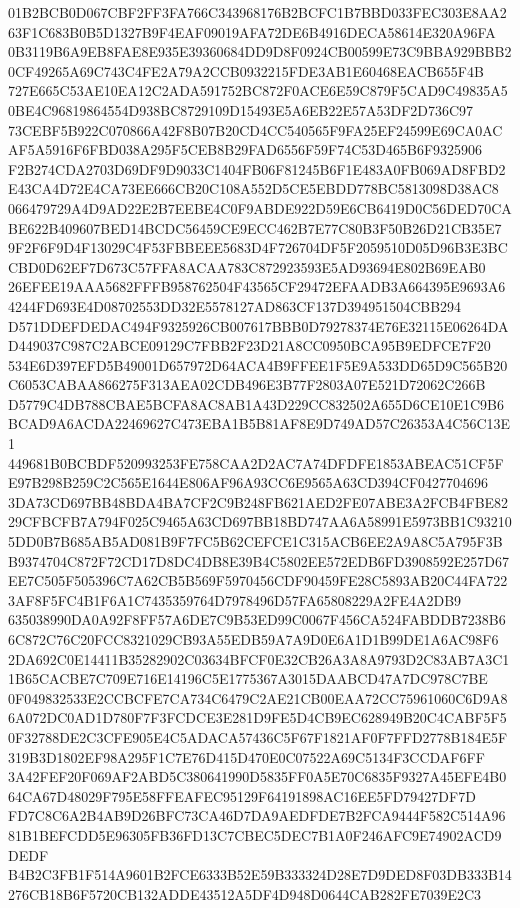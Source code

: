 \documentclass[UTF8,fontset=fandol,zihao=-4,a4paper]{ctexart}
\begin{document}
{{01B2BCB0D067CBF2FF3FA766C343968176B2BCFC1B7BBD033FEC303E8AA263F1C683B0B5D1327B9F4EAF09019AFA72DE6B4916DECA58614E320A96FA
0B3119B6A9EB8FAE8E935E39360684DD9D8F0924CB00599E73C9BBA929BBB20CF49265A69C743C4FE2A79A2CCB0932215FDE3AB1E60468EACB655F4B
727E665C53AE10EA12C2ADA591752BC872F0ACE6E59C879F5CAD9C49835A50BE4C96819864554D938BC8729109D15493E5A6EB22E57A53DF2D736C97
73CEBF5B922C070866A42F8B07B20CD4CC540565F9FA25EF24599E69CA0ACAF5A5916F6FBD038A295F5CEB8B29FAD6556F59F74C53D465B6F9325906
F2B274CDA2703D69DF9D9033C1404FB06F81245B6F1E483A0FB069AD8FBD2E43CA4D72E4CA73EE666CB20C108A552D5CE5EBDD778BC5813098D38AC8
066479729A4D9AD22E2B7EEBE4C0F9ABDE922D59E6CB6419D0C56DED70CABE622B409607BED14BCDC56459CE9ECC462B7E77C80B3F50B26D21CB35E7
9F2F6F9D4F13029C4F53FBBEEE5683D4F726704DF5F2059510D05D96B3E3BCCBD0D62EF7D673C57FFA8ACAA783C872923593E5AD93694E802B69EAB0
26EFEE19AAA5682FFFB958762504F43565CF29472EFAADB3A664395E9693A64244FD693E4D08702553DD32E5578127AD863CF137D394951504CBB294
D571DDEFDEDAC494F9325926CB007617BBB0D79278374E76E32115E06264DAD449037C987C2ABCE09129C7FBB2F23D21A8CC0950BCA95B9EDFCE7F20
534E6D397EFD5B49001D657972D64ACA4B9FFEE1F5E9A533DD65D9C565B20C6053CABAA866275F313AEA02CDB496E3B77F2803A07E521D72062C266B
D5779C4DB788CBAE5BCFA8AC8AB1A43D229CC832502A655D6CE10E1C9B6BCAD9A6ACDA22469627C473EBA1B5B81AF8E9D749AD57C26353A4C56C13E1
449681B0BCBDF520993253FE758CAA2D2AC7A74DFDFE1853ABEAC51CF5FE97B298B259C2C565E1644E806AF96A93CC6E9565A63CD394CF0427704696
3DA73CD697BB48BDA4BA7CF2C9B248FB621AED2FE07ABE3A2FCB4FBE8229CFBCFB7A794F025C9465A63CD697BB18BD747AA6A58991E5973BB1C93210
5DD0B7B685AB5AD081B9F7FC5B62CEFCE1C315ACB6EE2A9A8C5A795F3BB9374704C872F72CD17D8DC4DB8E39B4C5802EE572EDB6FD3908592E257D67
EE7C505F505396C7A62CB5B569F5970456CDF90459FE28C5893AB20C44FA7223AF8F5FC4B1F6A1C7435359764D7978496D57FA65808229A2FE4A2DB9
635038990DA0A92F8FF57A6DE7C9B53ED99C0067F456CA524FABDDB7238B66C872C76C20FCC8321029CB93A55EDB59A7A9D0E6A1D1B99DE1A6AC98F6
2DA692C0E14411B35282902C03634BFCF0E32CB26A3A8A9793D2C83AB7A3C11B65CACBE7C709E716E14196C5E1775367A3015DAABCD47A7DC978C7BE
0F049832533E2CCBCFE7CA734C6479C2AE21CB00EAA72CC75961060C6D9A86A072DC0AD1D780F7F3FCDCE3E281D9FE5D4CB9EC628949B20C4CABF5F5
0F32788DE2C3CFE905E4C5ADACA57436C5F67F1821AF0F7FFD2778B184E5F319B3D1802EF98A295F1C7E76D415D470E0C07522A69C5134F3CCDAF6FF
3A42FEF20F069AF2ABD5C380641990D5835FF0A5E70C6835F9327A45EFE4B064CA67D48029F795E58FFEAFEC95129F64191898AC16EE5FD79427DF7D
FD7C8C6A2B4AB9D26BFC73CA46D7DA9AEDFDE7B2FCA9444F582C514A9681B1BEFCDD5E96305FB36FD13C7CBEC5DEC7B1A0F246AFC9E74902ACD9DEDF
B4B2C3FB1F514A9601B2FCE6333B52E59B333324D28E7D9DED8F03DB333B14276CB18B6F5720CB132ADDE43512A5DF4D948D0644CAB282FE7039E2C3
}}
\end{document}
